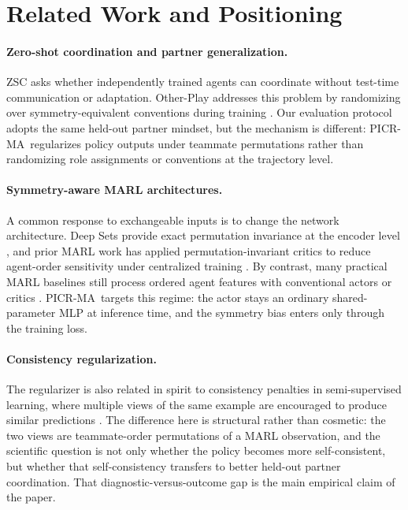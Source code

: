 \documentclass{article}
\newcommand{\method}{PICR-MA}
\begin{document}
\section{Related Work and Positioning}
\paragraph{Zero-shot coordination and partner generalization.}
ZSC asks whether independently trained agents can coordinate without test-time communication or adaptation. Other-Play addresses this problem by randomizing over symmetry-equivalent conventions during training \citep{hu2020otherplay}. Our evaluation protocol adopts the same held-out partner mindset, but the mechanism is different: \method\ regularizes policy outputs under teammate permutations rather than randomizing role assignments or conventions at the trajectory level.

\paragraph{Symmetry-aware MARL architectures.}
A common response to exchangeable inputs is to change the network architecture. Deep Sets provide exact permutation invariance at the encoder level \citep{zaheer2017deepsets}, and prior MARL work has applied permutation-invariant critics to reduce agent-order sensitivity under centralized training \citep{liu2020pic}. By contrast, many practical MARL baselines still process ordered agent features with conventional actors or critics \citep{lowe2017maddpg, sunehag2018vdn, rashid2018qmix, terry2020ps}. \method\ targets this regime: the actor stays an ordinary shared-parameter MLP at inference time, and the symmetry bias enters only through the training loss.

\paragraph{Consistency regularization.}
The regularizer is also related in spirit to consistency penalties in semi-supervised learning, where multiple views of the same example are encouraged to produce similar predictions \citep{tarvainen2017meanteacher, sohn2020fixmatch}. The difference here is structural rather than cosmetic: the two views are teammate-order permutations of a MARL observation, and the scientific question is not only whether the policy becomes more self-consistent, but whether that self-consistency transfers to better held-out partner coordination. That diagnostic-versus-outcome gap is the main empirical claim of the paper.
\end{document}
